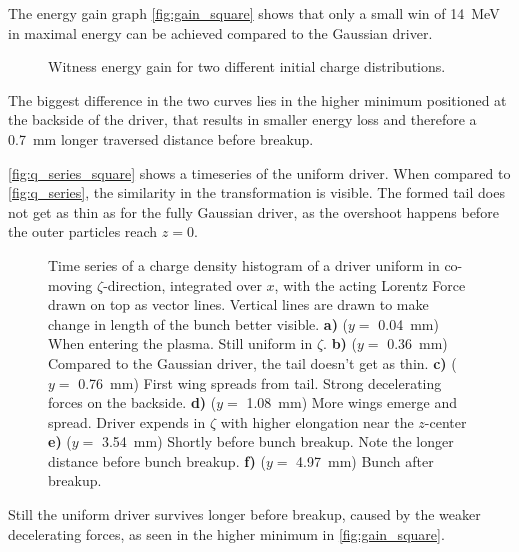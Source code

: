 \documentclass[bachelor_thesis]{subfiles}
\begin{document}
The energy gain graph \autoref{fig:gain_square} shows that only a small win of \qty{14}{\MeV} in maximal energy can be achieved compared to the Gaussian driver.
\begin{figure}
	\centering
	
	\caption{Witness energy gain for two different initial charge distributions.}
	\label{fig:gain_square}
\end{figure}
The biggest difference in the two curves lies in the higher minimum positioned at the backside of the driver, that results in smaller energy loss and therefore a \qty{0.7}{mm} longer traversed distance before breakup.

\autoref{fig:q_series_square} shows a timeseries of the uniform driver. When compared to \autoref{fig:q_series}, the similarity in the transformation is visible. The formed tail does not get as thin as for the fully Gaussian driver, as the overshoot happens before the outer particles reach $z=0$.
\begin{figure}
	\centering
	
	\caption{Time series of a charge density histogram of a driver uniform in co-moving $\zeta$-direction, integrated over $x$, with the acting Lorentz Force drawn on top as vector lines. Vertical lines are drawn to make change in length of the bunch better visible. 
	\textbf{a)} ($y=$ \qty{0.04}{mm}) When entering the plasma. Still uniform in $\zeta$.
	\textbf{b)} ($y=$ \qty{0.36}{mm}) Compared to the Gaussian driver, the tail doesn't get as thin.
	\textbf{c)} ($y=$ \qty{0.76}{mm}) First wing spreads from tail. Strong decelerating forces on the backside.
	\textbf{d)} ($y=$ \qty{1.08}{mm}) More wings emerge and spread. Driver expends in $\zeta$ with higher elongation near the $z$-center
	\textbf{e)} ($y=$ \qty{3.54}{mm}) Shortly before bunch breakup. Note the longer distance before bunch breakup.
	\textbf{f)} ($y=$ \qty{4.97}{mm}) Bunch after breakup.}
	\label{fig:q_series_square}
\end{figure}
Still the uniform driver survives longer before breakup, caused by the weaker decelerating forces, as seen in the higher minimum in \autoref{fig:gain_square}.
\end{document}
